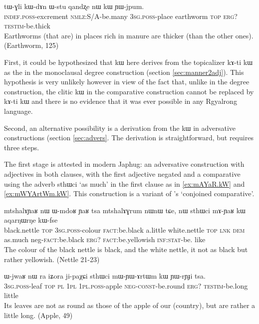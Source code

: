 \documentclass[oldfontcommands,oneside,a4paper,11pt]{article}
\newcommand{\ipa}[1]{{\phon #1}} %
\begin{document}
        \begin{exe}
  \ex  \label{ex:kW.YWjpum}  
  \gll 
  \ipa{tɯ-ɣli} 	\ipa{kɯ-dɤn} 	\ipa{ɯ-stu} 	\ipa{qandʐe} 	\ipa{nɯ} 	\ipa{kɯ} 	\ipa{ɲɯ-jpum.} \\
  \textsc{indef.poss}-excrement \textsc{nmlz}:S/A-be.many \textsc{3sg.poss}-place earthworm \textsc{top} \textsc{erg?} \textsc{testim}-be.thick   \\
  \glt Earthworms (that are) in places rich in manure are thicker (than the other ones).
   (Earthworm, 125)
   \end{exe} 

  First, it could be hypothesized that \ipa{kɯ} here derives from the topicalizer \ipa{kɤ-ti kɯ}  as the in the monoclausal degree construction (section \ref{sec:manner2adj}). This hypothesis is very unlikely however in view of the fact that, unlike in the degree construction, the clitic \ipa{kɯ} in the comparative construction cannot be replaced by \ipa{kɤ-ti kɯ} and there is no evidence that it was ever  possible in any Rgyalrong language.
  
  
Second, an alternative possibility is a derivation from the \ipa{kɯ} in adversative constructions (section \ref{sec:advers}. The derivation is straightforward, but requires three steps.

The first stage is attested in modern Japhug: an adversative construction with   adjectives in both  clauses, with the first adjective   negated and a comparative using the adverb \ipa{sthɯci} `as much' in the first clause as in \ref{ex:mAYaR.kW} and \ref{ex:mWYArtWm.kW}.  This construction is a variant of \citet{stassen11comparative}'s `conjoined comparative'.
        \begin{exe}
  \ex  \label{ex:mAYaR.kW}  
  \gll 
  \ipa{mtshalɤɲaʁ} 	\ipa{nɯ} 	\ipa{ɯ-mdoʁ} 	\ipa{ɲaʁ} 	\ipa{tsa} 	\ipa{mtshalɤɣrum} 	\ipa{nɯnɯ} 	\ipa{tɕe,} 	\ipa{nɯ} \ipa{sthɯci} 	\ipa{mɤ-ɲaʁ} 	\ipa{kɯ}   	\ipa{aqarŋɯrŋe} 	\ipa{kɯ-fse} 	\\
  black.nettle \textsc{top} \textsc{3sg.poss}-colour \textsc{fact}:be.black a.little   white.nettle \textsc{top} \textsc{lnk} \textsc{dem} as.much neg-\textsc{fact}:be.black  \textsc{erg?} \textsc{fact}:be.yellowish \textsc{inf:stat}-be. like \\
  \glt The colour of the black nettle is black, and the white nettle, it not as   black but rather yellowish.   (Nettle 21-23)
        \end{exe}
        
           \begin{exe}
  \ex  \label{ex:mWYArtWm.kW}  
  \gll      
\ipa{ɯ-jwaʁ} 	\ipa{nɯ} \ipa{ra} 	\ipa{iʑora} 	\ipa{ji-paχɕi} 	\ipa{sthɯci} 	\ipa{mɯ-ɲɯ-ɤrtɯm} 	\ipa{kɯ} 	\ipa{ɲɯ-rɲɟi} 	\ipa{tsa.} \\
\textsc{3sg.poss}-leaf \textsc{top} \textsc{pl} \textsc{1pl} \textsc{1pl.poss}-apple \textsc{neg-const}-be.round \textsc{erg?} \textsc{testim}-be.long little \\
\glt Its leaves  are not as round as those of the apple of our (country), but are rather a little long.
(Apple, 49)
          \end{exe} 
 
\end{document}
